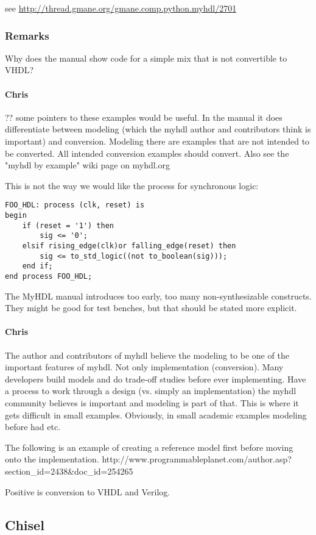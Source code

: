 \documentclass[10pt, technote, draftcls, onecolumn]{IEEEtran}
\newcommand{\comment}[3]{\paragraph*{\textbf{#1}}{\color{#3}#2}}
\newcommand{\cfelton}[1]{\comment{Chris}{#1}{Blue}}
\begin{document}
see \url{http://thread.gmane.org/gmane.comp.python.myhdl/2701}

\subsubsection{Remarks}

Why does the manual show code for a simple mix that is not convertible to VHDL?

\cfelton{?? some pointers to these examples would be useful.  In the manual it
does differentiate between modeling (which the myhdl author and contributors think
is important) and conversion.  Modeling there are examples that are not intended
to be converted.  All intended conversion examples should convert.  Also see the 
"myhdl by example" wiki page on myhdl.org}

This is not the way we would like the process for synchronous logic:

\begin{verbatim}
FOO_HDL: process (clk, reset) is
begin
    if (reset = '1') then
        sig <= '0';
    elsif rising_edge(clk)or falling_edge(reset) then
        sig <= to_std_logic((not to_boolean(sig)));
    end if;
end process FOO_HDL;
\end{verbatim}

The MyHDL manual introduces too early, too many non-synthesizable constructs.
They might be good for test benches, but that should be stated more explicit.

\cfelton{The author and contributors of myhdl believe the modeling to be one
of the important features of myhdl.  Not only implementation (conversion).  Many
developers build models and do trade-off studies before ever implementing.  
Have a process to work through a design (vs. simply an implementation) the 
myhdl community believes is important and modeling is part of that.  This is
where it gets difficult in small examples.  Obviously, in small academic examples
modeling before had etc. 

The following is an example of creating a reference model first before moving
onto the implementation.
http://www.programmableplanet.com/author.asp?section_id=2438&doc_id=254265
}

Positive is conversion to VHDL and Verilog.

\subsection{Chisel}
\end{document}
